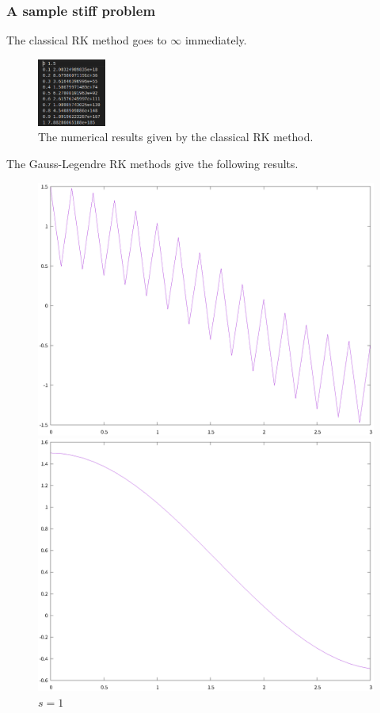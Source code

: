 \documentclass[9pt]{beamer}
\begin{document}
\begin{frame}
  \frametitle{A sample stiff problem}
  The classical RK method goes to $\infty$ immediately.
  \begin{figure}
    \centering
    \includegraphics[width=0.2\textwidth]{pic/1-2.png}
    \caption{The numerical results given by the classical RK method.}
  \end{figure}
  
  The Gauss-Legendre RK methods give the following results.
  \begin{figure}[H]
    \centering
    \begin{minipage}[t]{0.32\linewidth}
        \centering
        \includegraphics[width=0.95\linewidth]{pic/1-3.eps}
        \caption{$s=1$}
    \end{minipage}
    \begin{minipage}[t]{0.32\linewidth}
        \centering
        \includegraphics[width=0.95\linewidth]{pic/1-4.eps}

\end{minipage}
\end{figure}
\end{frame}
\end{document}
